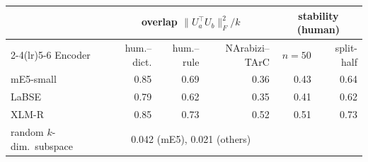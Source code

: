 \begin{tabular}{l rrr rr}
\toprule
 & \multicolumn{3}{c}{overlap $\|U_a^\top U_b\|_F^2/k$} & \multicolumn{2}{c}{stability (human)} \\
\cmidrule(lr){2-4}\cmidrule(lr){5-6}
Encoder & hum.--dict. & hum.--rule & NArabizi--TArC & $n{=}50$ & split-half \\
\midrule
mE5-small & 0.85 & 0.69 & 0.36 & 0.43 & 0.64 \\
LaBSE & 0.79 & 0.62 & 0.35 & 0.41 & 0.62 \\
XLM-R & 0.85 & 0.73 & 0.52 & 0.51 & 0.73 \\
\midrule
random $k$-dim.\ subspace & \multicolumn{3}{c}{0.042 (mE5), 0.021 (others)} & & \\
\bottomrule
\end{tabular}
